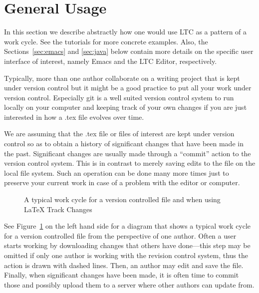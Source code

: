 \section{General Usage} \label{sec:general-use}
\newcommand{\generalscale}{0.9}  %

In this section we describe abstractly how one would use LTC as a pattern of a work cycle. See the tutorials for more concrete examples.  Also, the Sections~\ref{sec:emacs} and \ref{sec:java} below contain more details on the specific user interface of interest, namely Emacs and the LTC Editor, respectively.

Typically, more than one author collaborate on a writing project that is kept under version control but it might be a good practice to put all your work under version control.  Especially git is a well suited version control system to run locally on your computer and keeping track of your own changes if you are just interested in how a .tex file evolves over time.

We are assuming that the .tex file or files of interest are kept under version control so as to obtain a history of significant changes that have been made in the past.  Significant changes are usually made through a ``commit'' action to the version control system.  This is in contrast to merely saving edits to the file on the local file system.  Such an operation can be done many more times just to preserve your current work in case of a problem with the editor or computer.

\begin{figure}[t]
\centering
  \hfill %
\caption{A typical work cycle for a version controlled file and when using LaTeX Track Changes} \label{fig:work-cycle}
\end{figure}

See Figure~\ref{fig:work-cycle} on the left hand side for a diagram that shows a typical work cycle for a version controlled file from the perspective of one author.  Often a user starts working by downloading changes that others have done---this step may be omitted if only one author is working with the revision control system, thus the action is drawn with dashed lines.  Then, an author may edit and save the file.  Finally, when significant changes have been made, it is often time to commit those and possibly upload them to a server where other authors can update from.

